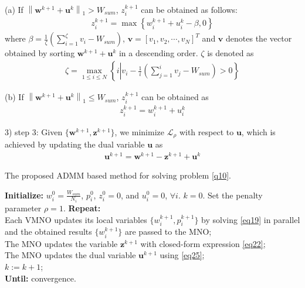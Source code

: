 \documentclass[journal]{IEEEtran}
\begin{document}
(a) If $\left\|\mathbf{w}^{k+1} + \mathbf{u}^k \right\|_1 > W_{sum}$, $z_i^{k+1}$ can be obtained as follows:
\begin{align} \label{eq22}
z_i^{k+1} = \max\left\{w_i^{k+1} + u_i^k - \beta, 0\right\}
\end{align}
where $\beta = \frac{1}{\zeta}\left(\sum\limits_{i = 1}^{\zeta} v_i - W_{sum} \right)$, $\mathbf{v} = \left[v_1, v_2, \cdots, v_N\right]^T$ and $\mathbf{v}$ denotes the vector obtained by sorting $\mathbf{w}^{k+1} + \mathbf{u}^k$ in a descending order. $\zeta$ is denoted as 
\begin{align}
\zeta = \max_{1 \leq i \leq N} \left\{ i \left| v_i - \frac{1}{i}\left(\sum\limits_{j = 1}^{i} v_j - W_{sum}\right) > 0 \right. \right\}
\end{align}

(b) If $\left\|\mathbf{w}^{k+1} + \mathbf{u}^k \right\|_1 \leq W_{sum}$, $z_i^{k+1}$ can be obtained as
\begin{align}
z_i^{k+1} = w_i^{k+1} + u_i^k
\end{align}

3) step 3: Given $\{\mathbf{w}^{k+1}, \mathbf{z}^{k+1}\}$, we minimize $\mathcal{L}_\rho$ with respect to $\mathbf{u}$, which is achieved
by updating the dual variable $\mathbf{u}$ as
\begin{align} \label{eq25}
\mathbf{u}^{k+1} =\mathbf{w}^{k+1} - \mathbf{z}^{k+1} + \mathbf{u}^k
\end{align}
\begin{algorithm}[h]
	\caption{The proposed ADMM based method for solving problem \eqref{q10}.}
	\begin{algorithmic}[1]
		\STATE \textbf{Initialize:} $w_i^0 = \frac{W_{sum}}{N_i}$, $p_i^0$, $z_i^0 = 0$, and $u_i^0 = 0$, $\forall i$. $k = 0$. Set the penalty parameter $\rho = 1$. \STATE
		\textbf{Repeat:} \\
		Each VMNO updates its local variables $\{w_i^{k+1}, p_i^{k+1}\}$ by solving \eqref{eq19} in parallel and the obtained results $\{w_i^{k+1}\}$ are passed to the MNO;\\
		The MNO updates the variable $\mathbf{z}^{k+1}$ with closed-form expression \eqref{eq22};\\
		The MNO updates the dual variable $\mathbf{u}^{k+1}$ using \eqref{eq25};\\
		$k:=k+1$;\\
		\STATE \textbf{Until:} convergence.
	\end{algorithmic}
\end{algorithm}
\end{document}
